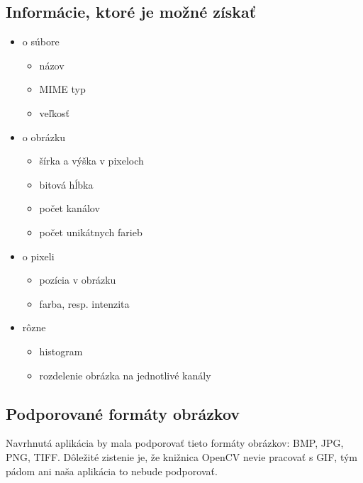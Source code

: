 \subsection{Informácie, ktoré je možné získať}
\begin{itemize}
	\item o súbore
	\begin{itemize}
		\item názov
		\item MIME typ
		\item veľkosť
	\end{itemize}
	\item o obrázku
	\begin{itemize}
		\item šírka a výška v pixeloch
		\item bitová hĺbka
		\item počet kanálov
		\item počet unikátnych farieb
	\end{itemize}
	\item o pixeli
	\begin{itemize}
		\item pozícia v obrázku
		\item farba, resp. intenzita
	\end{itemize}
	\item rôzne
	\begin{itemize}
		\item histogram
		\item rozdelenie obrázka na jednotlivé kanály
	\end{itemize}
\end{itemize}

\subsection{Podporované formáty obrázkov}
Navrhnutá aplikácia by mala podporovať tieto formáty obrázkov: BMP, JPG, PNG, TIFF. Dôležité zistenie je, že knižnica OpenCV nevie pracovať s GIF\cite{OpenCVIm84:online}, tým pádom ani naša aplikácia to nebude podporovať.